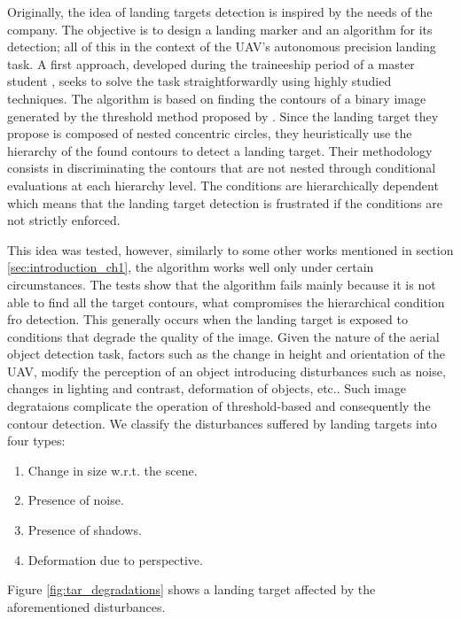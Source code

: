 Originally, the idea of landing targets detection is inspired by the needs of the \cite{Internest:WebPage:} company. The objective is to design a landing marker and an algorithm for its detection; all of this in the context of the UAV's autonomous precision landing task. 
A first approach, developed during the traineeship period of a master student \citep{BaquedanoA.:ESIEE:2017}, seeks to solve the task straightforwardly using highly studied techniques. The algorithm is based on finding the contours of a binary image generated by the threshold method proposed by \cite{Otsu:SMC:1979}. Since the landing target they propose is composed of nested concentric circles, they heuristically use the hierarchy of the found contours to detect a landing target. Their methodology consists in discriminating the contours that are not nested through conditional evaluations at each hierarchy level. The conditions are hierarchically dependent which means that the landing target detection is frustrated if the conditions are not strictly enforced.

This idea was tested, however, similarly to some other works mentioned in section \ref{sec:introduction_ch1}, the algorithm works well only under certain circumstances. The tests show that the algorithm fails mainly because it is not able to find all the target contours, what compromises the hierarchical condition fro detection. This generally occurs when the landing target is exposed to conditions that degrade the quality of the image. Given the nature of the aerial object detection task, factors such as the change in height and orientation of the UAV, modify the perception of an object introducing disturbances such as noise, changes in lighting and contrast, deformation of objects, etc.. Such image degrataions complicate the operation of threshold-based and consequently the contour detection. We classify the disturbances suffered by landing targets into four types: 

\begin{enumerate}
	\item Change in size w.r.t. the scene.
	\item Presence of noise.
	\item Presence of shadows.
	\item Deformation due to perspective.
\end{enumerate}
Figure \ref{fig:tar_degradations} shows a landing target affected by the aforementioned disturbances.
  
